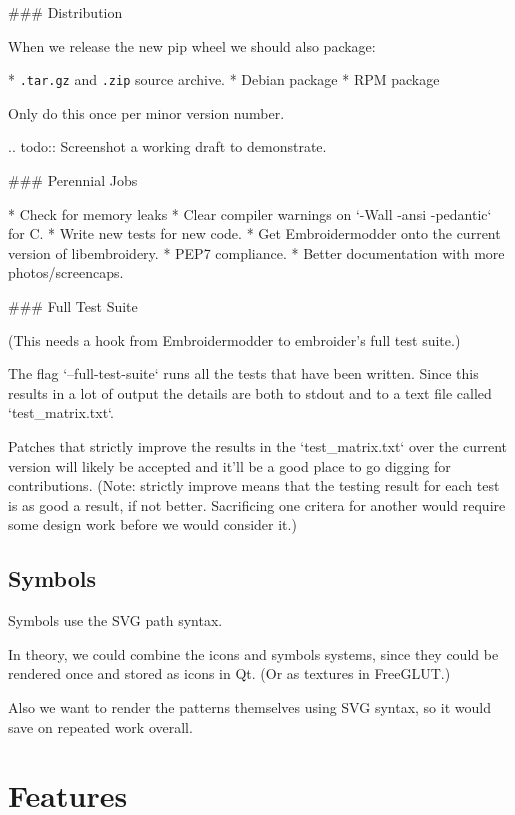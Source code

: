 ### Distribution


When we release the new pip wheel we should also package:

* \texttt{.tar.gz} and \texttt{.zip} source archive.
* Debian package
* RPM package

Only do this once per minor version number.

.. todo::
   Screenshot a working draft to demonstrate.

### Perennial Jobs

* Check for memory leaks
* Clear compiler warnings on `-Wall -ansi -pedantic` for C.
* Write new tests for new code.
* Get Embroidermodder onto the current version of libembroidery.
* PEP7 compliance.
* Better documentation with more photos/screencaps.

### Full Test Suite


(This needs a hook from Embroidermodder to embroider's full test suite.)

The flag `--full-test-suite` runs all the tests that have been written.
Since this results in a lot of output the details are both to stdout
and to a text file called `test\_matrix.txt`.

Patches that strictly improve the results in the `test\_matrix.txt` over
the current version will likely be accepted and it'll be a good place
to go digging for contributions. (Note: strictly improve means that
the testing result for each test is as good a result, if not better.
Sacrificing one critera for another would require some design work
before we would consider it.)

\subsection{Symbols}


Symbols use the SVG path syntax.

In theory, we could combine the icons and symbols systems, since they could be
rendered once and stored as icons in Qt. (Or as textures in FreeGLUT.)

Also we want to render the patterns themselves using SVG syntax, so it would
save on repeated work overall.

\section{Features}

